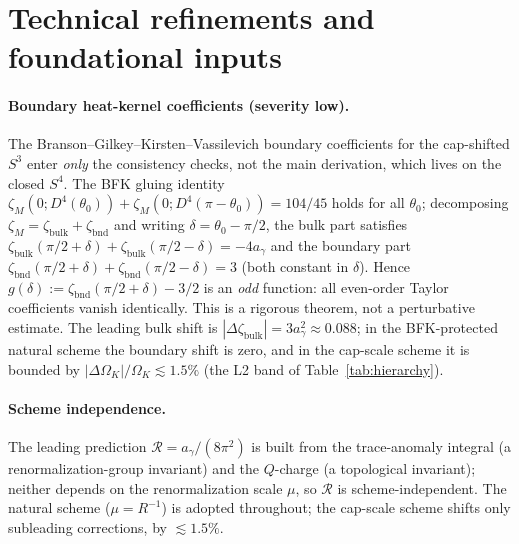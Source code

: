 \documentclass[11pt,a4paper]{article}
\theoremstyle{plain}
\theoremstyle{definition}
\theoremstyle{remark}
\newcommand{\Ok}{\Omega_K}
\newcommand{\ag}{a_\gamma}
\newcommand{\Rtop}{\mathcal{R}}
\begin{document}
\section{Technical refinements and foundational inputs}
\label{sec:refine}

\paragraph{Boundary heat-kernel coefficients (severity low).}
The Branson--Gilkey--Kirsten--Vassilevich boundary coefficients for the cap-shifted $S^3$ enter
\emph{only} the consistency checks, not the main derivation, which lives on the closed $S^4$. The
BFK gluing identity $\zeta_M(0;D^4(\theta_0)) + \zeta_M(0;D^4(\pi-\theta_0)) = 104/45$ holds for
all $\theta_0$; decomposing $\zeta_M = \zeta_{\mathrm{bulk}} + \zeta_{\mathrm{bnd}}$ and writing
$\delta = \theta_0 - \pi/2$, the bulk part satisfies
$\zeta_{\mathrm{bulk}}(\pi/2+\delta) + \zeta_{\mathrm{bulk}}(\pi/2-\delta) = -4\ag$ and the
boundary part $\zeta_{\mathrm{bnd}}(\pi/2+\delta) + \zeta_{\mathrm{bnd}}(\pi/2-\delta) = 3$
(both constant in $\delta$). Hence $g(\delta) := \zeta_{\mathrm{bnd}}(\pi/2+\delta) - 3/2$ is an
\emph{odd} function: all even-order Taylor coefficients vanish identically. This is a rigorous
theorem, not a perturbative estimate. The leading bulk shift is $|\Delta\zeta_{\mathrm{bulk}}|
= 3\ag^2 \approx 0.088$; in the BFK-protected natural scheme the boundary shift is zero, and in
the cap-scale scheme it is bounded by $|\Delta\Ok|/\Ok \lesssim 1.5\%$ (the L2 band of
Table~\ref{tab:hierarchy}).

\paragraph{Scheme independence.}
The leading prediction $\Rtop = \ag/(8\pi^2)$ is built from the trace-anomaly integral (a
renormalization-group invariant) and the $Q$-charge (a topological invariant); neither depends on
the renormalization scale $\mu$, so $\Rtop$ is scheme-independent. The natural scheme
($\mu = R^{-1}$) is adopted throughout; the cap-scale scheme shifts only subleading corrections,
by $\lesssim 1.5\%$.
\end{document}
